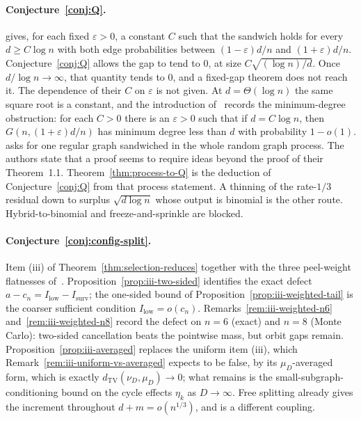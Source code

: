 \documentclass[11pt]{article}
\newcommand{\dTV}{d_{\mathrm{TV}}}
\begin{document}
\paragraph{Conjecture~\ref{conj:Q}.}
\cite[Theorem~1.1]{BIM25} gives, for each fixed \(\varepsilon>0\), a constant
\(C\) such that the sandwich holds for every \(d\ge C\log n\) with both edge
probabilities between \((1-\varepsilon)d/n\) and \((1+\varepsilon)d/n\).
Conjecture~\ref{conj:Q} allows the gap to tend to \(0\), at size
\(C\sqrt{(\log n)/d}\).
Once \(d/\log n\to\infty\), that quantity tends to \(0\), and a fixed-gap
theorem does not reach it. The dependence of their \(C\) on \(\varepsilon\) is
not given.
At \(d=\Theta(\log n)\) the same square root is a constant, and the
introduction of~\cite{BIM25} records the minimum-degree obstruction: for each
\(C>0\) there is an \(\varepsilon>0\) such that if \(d=C\log n\), then
\(G(n,(1+\varepsilon)d/n)\) has minimum degree less than \(d\) with probability
\(1-o(1)\).
\cite[Conjecture~1.3]{BIM25} asks for one regular graph sandwiched in the
whole random graph process. The authors state that a proof seems to require
ideas beyond the proof of their Theorem~1.1.
Theorem~\ref{thm:process-to-Q} is the deduction of
Conjecture~\ref{conj:Q} from that process statement.
A thinning of the rate-\(1/3\) residual down to surplus \(\sqrt{d\log n}\)
whose output is binomial is the other route.
Hybrid-to-binomial and freeze-and-sprinkle are blocked.

\paragraph{Conjecture~\ref{conj:config-split}.}
Item (iii) of Theorem~\ref{thm:selection-reduces} together with the three
peel-weight flatnesses of~\cite{PlusOneV1}.
Proposition~\ref{prop:iii-two-sided} identifies the exact defect
\(a-c_n=I_{\mathrm{low}}-I_{\mathrm{surv}}\); the one-sided bound of
Proposition~\ref{prop:iii-weighted-tail} is the coarser sufficient condition
\(I_{\mathrm{low}}=o(c_n)\).
Remarks~\ref{rem:iii-weighted-n6} and~\ref{rem:iii-weighted-n8} record the
defect on \(n=6\) (exact) and \(n=8\) (Monte Carlo): two-sided cancellation
beats the pointwise mass, but orbit gaps remain.
Proposition~\ref{prop:iii-averaged} replaces the uniform item (iii), which
Remark~\ref{rem:iii-uniform-vs-averaged} expects to be false, by its
\(\mu_D\)-averaged form, which is exactly \(\dTV(\nu_D,\mu_D)\to0\); what remains is
the small-subgraph-conditioning bound on the cycle effects \(\eta_k\) as
\(D\to\infty\).
Free splitting already gives the increment throughout \(d+m=o(n^{1/3})\),
and is a different coupling.
\end{document}
